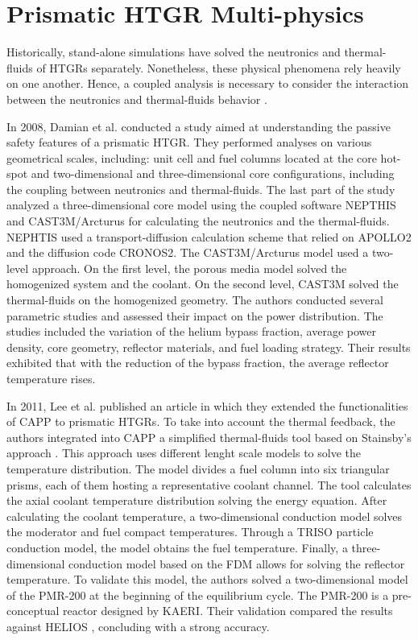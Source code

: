 \section{Prismatic HTGR Multi-physics}
\label{sec:litreview-multi}

Historically, stand-alone simulations have solved the neutronics and thermal-fluids of HTGRs separately.
Nonetheless, these physical phenomena rely heavily on one another.
Hence, a coupled analysis is necessary to consider the interaction between the neutronics and thermal-fluids behavior \cite{tak_cappgamma_2016}.

In 2008, Damian et al. \cite{damian_vhtr_2008} conducted a study aimed at understanding the passive safety features of a prismatic \gls{HTGR}.
They performed analyses on various geometrical scales, including: unit cell and fuel columns located at the core hot-spot and two-dimensional and three-dimensional core configurations, including the coupling between neutronics and thermal-fluids.
The last part of the study analyzed a three-dimensional core model using the coupled software NEPTHIS and CAST3M/Arcturus for calculating the neutronics and the thermal-fluids.
NEPHTIS used a transport-diffusion calculation scheme that relied on APOLLO2 \cite{sanchez_apollo2_1999} and the diffusion code CRONOS2.
The CAST3M/Arcturus model used a two-level approach.
On the first level, the porous media model solved the homogenized system and the coolant.
On the second level, CAST3M solved the thermal-fluids on the homogenized geometry.
The authors conducted several parametric studies and assessed their impact on the power distribution.
The studies included the variation of the helium bypass fraction, average power density, core geometry, reflector materials, and fuel loading strategy.
Their results exhibited that with the reduction of the bypass fraction, the average reflector temperature rises.

In 2011, Lee et al. published an article \cite{lee_development_2011} in which they extended the functionalities of CAPP to prismatic \glspl{HTGR}.
To take into account the thermal feedback, the authors integrated into CAPP a simplified thermal-fluids tool based on Stainsby's approach \cite{stainsby_investigation_2008}.
This approach uses different lenght scale models to solve the temperature distribution.
The model divides a fuel column into six triangular prisms, each of them hosting a representative coolant channel.
The tool calculates the axial coolant temperature distribution solving the energy equation.
After calculating the coolant temperature, a two-dimensional conduction model solves the moderator and fuel compact temperatures.
Through a TRISO particle conduction model, the model obtains the fuel temperature.
Finally, a three-dimensional conduction model based on the \gls{FDM} allows for solving the reflector temperature.
To validate this model, the authors solved a two-dimensional model of the PMR-200 at the beginning of the equilibrium cycle.
The PMR-200 is a pre-conceptual reactor designed by \gls{KAERI}.
Their validation compared the results against HELIOS \cite{stammler_helios_1998}, concluding with a strong accuracy.

